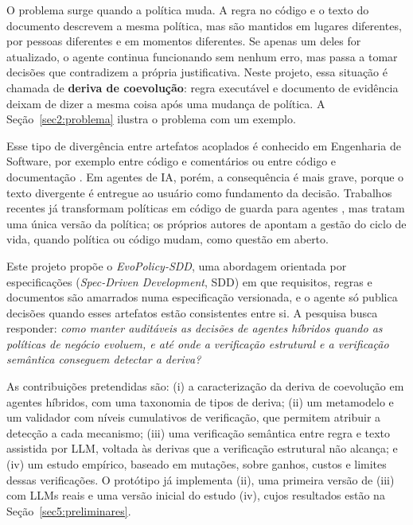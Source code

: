 \documentclass[12pt]{article}
\begin{document}
O problema surge quando a política muda. A regra no código e o texto do documento descrevem a mesma política, mas são mantidos em lugares diferentes, por pessoas diferentes e em momentos diferentes. Se apenas um deles for atualizado, o agente continua funcionando sem nenhum erro, mas passa a tomar decisões que contradizem a própria justificativa. Neste projeto, essa situação é chamada de \textbf{deriva de coevolução}: regra executável e documento de evidência deixam de dizer a mesma coisa após uma mudança de política. A Seção~\ref{sec2:problema} ilustra o problema com um exemplo.

Esse tipo de divergência entre artefatos acoplados é conhecido em Engenharia de Software, por exemplo entre código e comentários \cite{tan2007icomment,wen2019codecomment} ou entre código e documentação \cite{aghajani2019docissues}. Em agentes de IA, porém, a consequência é mais grave, porque o texto divergente é entregue ao usuário como fundamento da decisão. Trabalhos recentes já transformam políticas em código de guarda para agentes \cite{zwerdling2025policy,datla2025executable}, mas tratam uma única versão da política; os próprios autores de \cite{zwerdling2025policy} apontam a gestão do ciclo de vida, quando política ou código mudam, como questão em aberto.

Este projeto propõe o \textit{EvoPolicy-SDD}, uma abordagem orientada por especificações (\textit{Spec-Driven Development}, SDD) em que requisitos, regras e documentos são amarrados numa especificação versionada, e o agente só publica decisões quando esses artefatos estão consistentes entre si. A pesquisa busca responder: \textit{como manter auditáveis as decisões de agentes híbridos quando as políticas de negócio evoluem, e até onde a verificação estrutural e a verificação semântica conseguem detectar a deriva?}

As contribuições pretendidas são: (i) a caracterização da deriva de coevolução em agentes híbridos, com uma taxonomia de tipos de deriva; (ii) um metamodelo e um validador com níveis cumulativos de verificação, que permitem atribuir a detecção a cada mecanismo; (iii) uma verificação semântica entre regra e texto assistida por LLM, voltada às derivas que a verificação estrutural não alcança; e (iv) um estudo empírico, baseado em mutações, sobre ganhos, custos e limites dessas verificações. O protótipo já implementa (ii), uma primeira versão de (iii) com LLMs reais e uma versão inicial do estudo (iv), cujos resultados estão na Seção~\ref{sec5:preliminares}.
\end{document}
